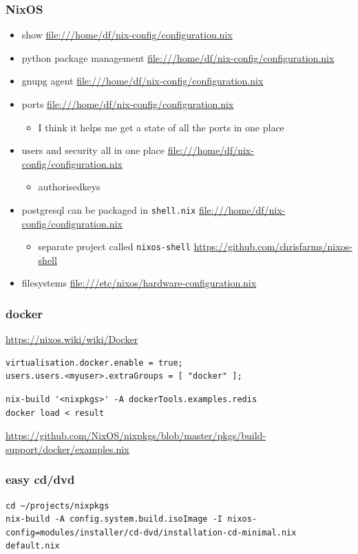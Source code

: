 \documentclass[11pt]{article}
\begin{document}
\subsubsection{NixOS}
\label{sec:org899d666}
\begin{itemize}
\item show \url{file:///home/df/nix-config/configuration.nix}
\item python package management \url{file:///home/df/nix-config/configuration.nix}
\item gnupg agent \url{file:///home/df/nix-config/configuration.nix}
\item ports \url{file:///home/df/nix-config/configuration.nix}
\begin{itemize}
\item I think it helps me get a state of all the ports in one place
\end{itemize}
\item users and security all in one place
\url{file:///home/df/nix-config/configuration.nix}
\begin{itemize}
\item authorisedkeys
\end{itemize}
\item postgresql can be packaged in \texttt{shell.nix}
\url{file:///home/df/nix-config/configuration.nix}
\begin{itemize}
\item separate project called \texttt{nixos-shell}
\url{https://github.com/chrisfarms/nixos-shell}
\end{itemize}
\item filesystems \url{file:///etc/nixos/hardware-configuration.nix}
\end{itemize}
\subsubsection{docker}
\label{sec:orgeaac453}
\url{https://nixos.wiki/wiki/Docker}
\begin{verbatim}
virtualisation.docker.enable = true;
users.users.<myuser>.extraGroups = [ "docker" ];
\end{verbatim}
\begin{verbatim}
nix-build '<nixpkgs>' -A dockerTools.examples.redis
docker load < result
\end{verbatim}
\url{https://github.com/NixOS/nixpkgs/blob/master/pkgs/build-support/docker/examples.nix}
\subsubsection{easy cd/dvd}
\label{sec:org6b8560b}
\begin{verbatim}
cd ~/projects/nixpkgs
nix-build -A config.system.build.isoImage -I nixos-config=modules/installer/cd-dvd/installation-cd-minimal.nix default.nix
\end{verbatim}
\end{document}
